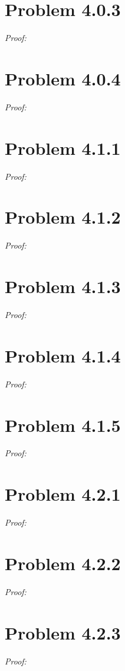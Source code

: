 \documentclass[11pt]{article}
\theoremstyle{definition}
\theoremstyle{remark}
\theoremstyle{problem}
\begin{document}
\section{Problem 4.0.3}
\textit{Proof:} 
\newpage

\section{Problem 4.0.4}
\textit{Proof:} 
\newpage

\section{Problem 4.1.1}
\textit{Proof:} 
\newpage

\section{Problem 4.1.2}
\textit{Proof:} 
\newpage

\section{Problem 4.1.3}
\textit{Proof:} 
\newpage

\section{Problem 4.1.4}
\textit{Proof:} 
\newpage

\section{Problem 4.1.5}
\textit{Proof:} 
\newpage

\section{Problem 4.2.1}
\textit{Proof:} 
\newpage

\section{Problem 4.2.2}
\textit{Proof:} 
\newpage

\section{Problem 4.2.3}
\textit{Proof:} 
\newpage
\end{document}
